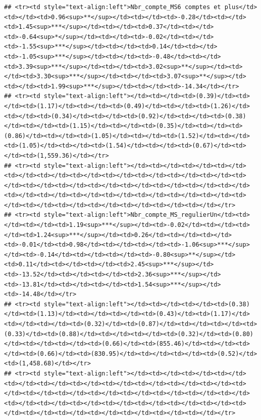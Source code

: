 \documentclass[
]{article}
\begin{document}
\begin{verbatim}
## <tr><td style="text-align:left">Nbr_compte_MS6 comptes et plus</td><td></td><td>0.96<sup>**</sup></td><td></td><td>-0.28</td><td></td><td>1.45<sup>***</sup></td><td></td><td>0.37</td><td></td><td>-0.64<sup>*</sup></td><td></td><td>-0.02</td><td></td><td>-1.55<sup>***</sup></td><td></td><td>0.14</td><td></td><td>-1.05<sup>***</sup></td><td></td><td>-0.48</td><td></td><td>3.39<sup>***</sup></td><td></td><td>3.02<sup>**</sup></td><td></td><td>3.30<sup>***</sup></td><td></td><td>3.07<sup>**</sup></td><td></td><td>1.99<sup>***</sup></td><td></td><td>-14.34</td></tr>
## <tr><td style="text-align:left"></td><td></td><td>(0.39)</td><td></td><td>(1.17)</td><td></td><td>(0.49)</td><td></td><td>(1.26)</td><td></td><td>(0.34)</td><td></td><td>(0.92)</td><td></td><td>(0.38)</td><td></td><td>(1.15)</td><td></td><td>(0.35)</td><td></td><td>(0.86)</td><td></td><td>(1.05)</td><td></td><td>(1.52)</td><td></td><td>(1.05)</td><td></td><td>(1.54)</td><td></td><td>(0.67)</td><td></td><td>(1,559.36)</td></tr>
## <tr><td style="text-align:left"></td><td></td><td></td><td></td><td></td><td></td><td></td><td></td><td></td><td></td><td></td><td></td><td></td><td></td><td></td><td></td><td></td><td></td><td></td><td></td><td></td><td></td><td></td><td></td><td></td><td></td><td></td><td></td><td></td><td></td><td></td><td></td><td></td></tr>
## <tr><td style="text-align:left">Nbr_compte_MS_regulierUn</td><td></td><td></td><td>1.19<sup>***</sup></td><td>-0.02</td><td></td><td></td><td>1.24<sup>***</sup></td><td>0.26</td><td></td><td></td><td>-0.01</td><td>0.98</td><td></td><td></td><td>-1.06<sup>***</sup></td><td>-0.14</td><td></td><td></td><td>-0.80<sup>**</sup></td><td>0.11</td><td></td><td></td><td>2.45<sup>***</sup></td><td>-13.52</td><td></td><td></td><td>2.36<sup>***</sup></td><td>-13.81</td><td></td><td></td><td>1.54<sup>***</sup></td><td>-14.48</td></tr>
## <tr><td style="text-align:left"></td><td></td><td></td><td>(0.38)</td><td>(1.13)</td><td></td><td></td><td>(0.43)</td><td>(1.17)</td><td></td><td></td><td>(0.32)</td><td>(0.87)</td><td></td><td></td><td>(0.33)</td><td>(0.88)</td><td></td><td></td><td>(0.32)</td><td>(0.80)</td><td></td><td></td><td>(0.66)</td><td>(855.46)</td><td></td><td></td><td>(0.66)</td><td>(830.95)</td><td></td><td></td><td>(0.52)</td><td>(1,458.68)</td></tr>
## <tr><td style="text-align:left"></td><td></td><td></td><td></td><td></td><td></td><td></td><td></td><td></td><td></td><td></td><td></td><td></td><td></td><td></td><td></td><td></td><td></td><td></td><td></td><td></td><td></td><td></td><td></td><td></td><td></td><td></td><td></td><td></td><td></td><td></td><td></td><td></td></tr>

\end{verbatim}
\end{document}
